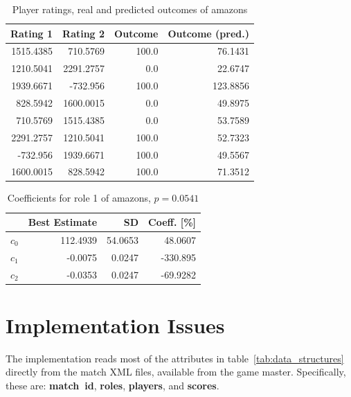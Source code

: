\documentclass[a4paper,10pt]{article}
\begin{document}
\begin{table}[htp]
	\caption{Player ratings, real and predicted outcomes of amazons}
	\label{tab:outcomes_amazons}
	\begin{center}
		\begin{tabular}{rrrr}
			\hline
			\textbf{Rating 1} & \textbf{Rating 2} & \textbf{Outcome} & \textbf{Outcome (pred.)} \\
			\hline
				1515.4385    &	710.5769     &	100.0        &	76.1431  \\
				1210.5041    &	2291.2757    &	0.0          &	22.6747  \\
				1939.6671    &	-732.956     &	100.0        &	123.8856 \\
				828.5942     &	1600.0015    &	0.0          &	49.8975  \\
				710.5769     &	1515.4385    &	0.0          &	53.7589  \\
				2291.2757    &	1210.5041    &	100.0        &	52.7323  \\
				-732.956     &	1939.6671    &	100.0        &	49.5567  \\
				1600.0015    &	828.5942     &	100.0        &	71.3512  \\
			\hline
		\end{tabular}
	\end{center}
\end{table}

\begin{table}[htp]
	\caption{Coefficients for role 1 of amazons, $p = 0.0541$}
	\label{tab:coefficients_amazons}
	\begin{center}
		\begin{tabular}{rrrr}
			\hline
			& \textbf{Best Estimate} & \textbf{SD} & \textbf{Coeff. [\%]} \\ 
			\hline
			$c_0$   &	112.4939     &	54.0653      &	48.0607  \\
			$c_1$   &	-0.0075      &	0.0247       &	-330.895 \\
			$c_2$   &	-0.0353      &	0.0247       &	-69.9282 \\
			\hline
		\end{tabular}
	\end{center}
\end{table}


\section{Implementation Issues}

The implementation reads most of the attributes in
table~\ref{tab:data_structures} directly from the match XML files, available
from the game master. Specifically, these are:
\textbf{match~id}, \textbf{roles}, \textbf{players}, and \textbf{scores}.
\end{document}
